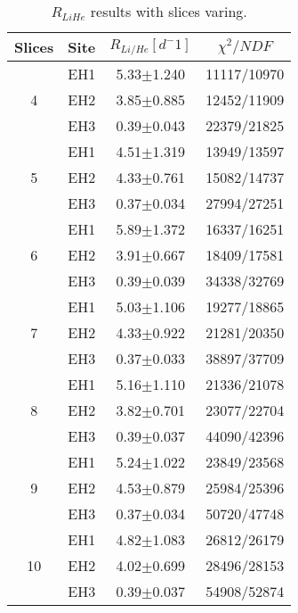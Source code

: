 \documentclass{article}
\begin{document}
\begin{table}[htb]
    \footnotesize
    \caption{\footnotesize $R_{LiHe}$ results with slices varing.}
\label{tab:Table}
    \begin{center}
        \begin{tabular}{cccc}
            \hline
                Slices  &   Site    &   $R_{Li/He}[d^-1]$   &   $\chi^{2}/NDF$  \\
            \hline
            		&	EH1	&	5.33$\pm$1.240	&	11117/10970\\
            	4	&	EH2	&	3.85$\pm$0.885	&	12452/11909\\
            		&	EH3	&	0.39$\pm$0.043	&	22379/21825\\
            \hline
            		&	EH1	&	4.51$\pm$1.319	&	13949/13597\\
            	5	&	EH2	&	4.33$\pm$0.761	&	15082/14737\\
            		&	EH3	&	0.37$\pm$0.034	&	27994/27251\\
            \hline
            		&	EH1	&	5.89$\pm$1.372	&	16337/16251\\
            	6	&	EH2	&	3.91$\pm$0.667	&	18409/17581\\
            		&	EH3	&	0.39$\pm$0.039	&	34338/32769\\
            \hline
            		&	EH1	&	5.03$\pm$1.106	&	19277/18865\\
            	7	&	EH2	&	4.33$\pm$0.922	&	21281/20350\\
            		&	EH3	&	0.37$\pm$0.033	&	38897/37709\\
            \hline
            		&	EH1	&	5.16$\pm$1.110	&	21336/21078\\
            	8	&	EH2	&	3.82$\pm$0.701	&	23077/22704\\
            		&	EH3	&	0.39$\pm$0.037	&	44090/42396\\
            \hline
            		&	EH1	&	5.24$\pm$1.022	&	23849/23568\\
            	9	&	EH2	&	4.53$\pm$0.879	&	25984/25396\\
            		&	EH3	&	0.37$\pm$0.034	&	50720/47748\\
            \hline
            		&	EH1	&	4.82$\pm$1.083	&	26812/26179\\
            	10	&	EH2	&	4.02$\pm$0.699	&	28496/28153\\
            		&	EH3	&	0.39$\pm$0.037	&	54908/52874\\
            \hline
        \end{tabular}
    \end{center}
\end{table}
\end{document}
